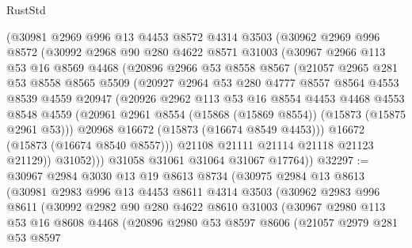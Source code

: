 \begin{lexlean}{RustStd}
\begin{coremodule}
      (@30981
        @2969
        @996
        @13
        @4453
        @8572
        @4314
        @3503
        (@30962
          @2969
          @996
          @8572
          (@30992
            @2968
            @90
            @280
            @4622
            @8571
            @31003
            (@30967
              @2966
              @113
              @53
              @16
              @8569
              @4468
              (@20896
                @2966
                @53
                @8558
                @8567
                (@21057
                  @2965
                  @281
                  @53
                  @8558
                  @8565
                  @5509
                  (@20927
                    @2964
                    @53
                    @280
                    @4777
                    @8557
                    @8564
                    @4553
                    @8539
                    @4559
                    @20947
                    (@20926
                      @2962
                      @113
                      @53
                      @16
                      @8554
                      @4453
                      @4468
                      @4553
                      @8548
                      @4559
                      (@20961 @2961 @8554 (@15868 (@15869 @8554)) (@15873 (@15875 @2961 @53)))
                      @20968
                      @16672
                      (@15873 (@16674 @8549 @4453)))
                    @16672
                    (@15873 (@16674 @8540 @8557)))
                  @21108
                  @21111
                  @21114
                  @21118
                  @21123
                  @21129))
              @31052)))
        @31058
        @31061
        @31064
        @31067
        @17764))
@32297 := @30967
    @2984
    @3030
    @13
    @19
    @8613
    @8734
    (@30975
      @2984
      @13
      @8613
      (@30981
        @2983
        @996
        @13
        @4453
        @8611
        @4314
        @3503
        (@30962
          @2983
          @996
          @8611
          (@30992
            @2982
            @90
            @280
            @4622
            @8610
            @31003
            (@30967
              @2980
              @113
              @53
              @16
              @8608
              @4468
              (@20896
                @2980
                @53
                @8597
                @8606
                (@21057
                  @2979
                  @281
                  @53
                  @8597

\end{coremodule}
\end{lexlean}
